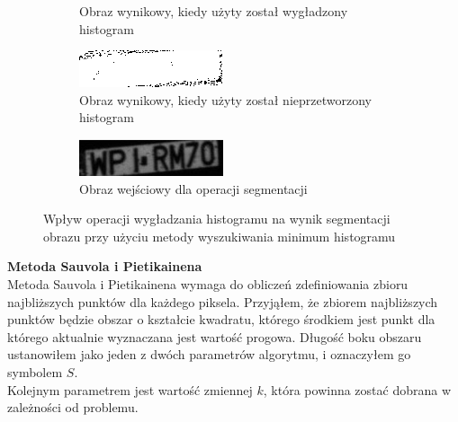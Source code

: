 \begin{figure}
\begin{subfigure}[b]{0.45\textwidth}
    \caption{Obraz wynikowy, kiedy użyty został wygładzony histogram}
    \label{fig:research_min_histogram_good_output}
  \end{subfigure}
  \begin{subfigure}[b]{0.45\textwidth}
    \includegraphics[width=\textwidth]{img/research-min-histogram-bad-output}
    \caption{Obraz wynikowy, kiedy użyty został nieprzetworzony histogram}
    \label{fig:research_min_histogram_bad_output}
  \end{subfigure}
 \begin{subfigure}[b]{0.45\textwidth}
    \includegraphics[width=\textwidth]{img/research-min-histogram-input}
    \caption{Obraz wejściowy dla operacji segmentacji}
    \label{fig:research_min_histogram_input}
  \end{subfigure}
  \caption{Wpływ operacji wygładzania histogramu na wynik segmentacji obrazu przy użyciu metody wyszukiwania minimum histogramu}
  \label{fig:research_min_histogram}
\end{figure}

\textbf{Metoda Sauvola i Pietikainena} \\
Metoda Sauvola i Pietikainena wymaga do obliczeń zdefiniowania zbioru najbliższych punktów dla każdego piksela. Przyjąłem, że zbiorem najbliższych punktów będzie obszar o kształcie kwadratu, którego środkiem jest punkt dla którego aktualnie wyznaczana jest wartość progowa. Długość boku obszaru ustanowiłem jako jeden z dwóch parametrów algorytmu, i oznaczyłem go symbolem $S$. \\
Kolejnym parametrem jest wartość zmiennej $k$, która powinna zostać dobrana w zależności od problemu.\\

